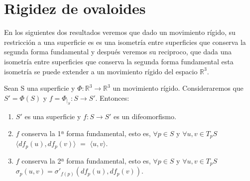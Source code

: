 \chapter*{Rigidez de ovaloides}





En los siguientes dos resultados veremos que dado un movimiento rígido, su restricción a una superficie es es una isometría entre superficies que conserva la segunda forma fundamental y después veremos su reciproco, que dada una isometría entre superficies que conserva la segunda forma fundamental esta isometría se puede extender a un movimiento rígido del espacio $\mathbb{R}^3$.

\begin{proposicion}\label{prop:rig1} %
	Sean S una superficie y  $\Phi : \mathbb{R}^3 \to \mathbb{R}^3$  un movimiento rígido. Consideraremos que $S' = \Phi(S)$ y $f = \Phi_{\mid_{S}} : S \to S'$. Entonces:
	\begin{enumerate}
		\item $S'$ es una superficie y $f : S \to S'$ es un difeomorfismo.
		\item $f$ conserva la 1ª forma fundamental, esto es, $\forall p \in S$ y $\forall u,v \in T_p S$ $\langle df_p(u), df_p(v) \rangle $ $=$ $ \langle u, v \rangle$.
		\item $f$ conserva la 2ª forma fundamental, esto es, $\forall p \in S$ y $\forall u,v \in T_p S$ $\sigma_p(u,v) = \sigma'_{f(p)}(df_p(u), df_p(v))$.
	\end{enumerate}
\end{proposicion}

